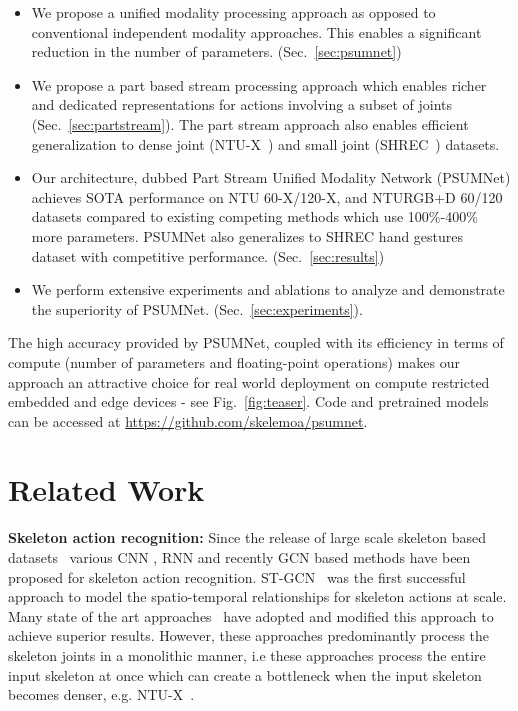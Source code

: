 \documentclass[runningheads]{llncs}
\begin{document}
\begin{itemize}
    \item We propose a unified modality processing approach as opposed to conventional independent modality approaches. This enables a significant reduction in the number of parameters. (Sec.~\ref{sec:psumnet})
    \item We propose a part based stream processing approach which enables richer and  dedicated representations for actions involving a subset of joints (Sec.~\ref{sec:partstream}). The part stream approach also enables efficient generalization to dense joint (NTU-X~\cite{trivedi2021ntux}) and small joint (SHREC~\cite{de20173d}) datasets. 
    \item Our architecture, dubbed Part Stream Unified Modality Network (PSUMNet)  achieves SOTA performance on NTU 60-X/120-X, and NTURGB+D 60/120 datasets compared to existing competing methods which use 100\%-400\% more parameters. PSUMNet also generalizes to SHREC hand gestures dataset with competitive performance. (Sec.~\ref{sec:results})
    \item We perform extensive experiments and ablations to analyze and demonstrate the superiority of PSUMNet. (Sec.~\ref{sec:experiments}).
\end{itemize}

The high accuracy provided by PSUMNet, coupled with its efficiency in terms of compute (number of parameters and floating-point operations) makes our approach an attractive choice for real world deployment on compute restricted embedded and edge devices - see Fig.~\ref{fig:teaser}. Code and pretrained models can be accessed at \href{https://github.com/skelemoa/psumnet}{https://github.com/skelemoa/psumnet}.


\section{Related Work}
\label{sec:related_work}
\noindent \textbf{Skeleton action recognition:} Since the release of large scale skeleton based datasets~\cite{Shahroudy_2016_CVPR,Liu_2019_NTURGBD120} various CNN \cite{zhang2019view,HernandezRuiz:2017:CDM:3123266.3123299,10.5555/3304415.3304527}, RNN \cite{7298714,HAN201785,zhang2019view,Zhao_2019_ICCV} and recently GCN based methods have been proposed for skeleton action recognition. ST-GCN~\cite{stgcn2018aaai} was the first successful approach to model the spatio-temporal relationships for skeleton actions at scale. Many state of the art approaches~\cite{cheng2020shiftgcn,liu2020disentangling,dstanet_accv2020,chen2021channel} have adopted and modified this approach to achieve superior results. However, these approaches predominantly process the skeleton joints in a monolithic manner, i.e these approaches process the entire input skeleton at once which can create a bottleneck when the input skeleton becomes denser, e.g. NTU-X~\cite{trivedi2021ntux}.
\end{document}
